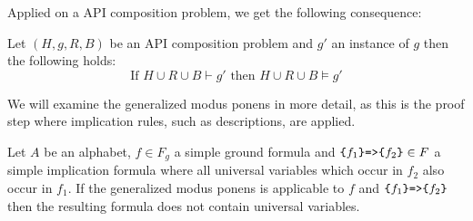 Applied on a API composition problem, we get the following consequence:
\begin{corollary}
Let $(H,g,R,B)$ be an API composition problem and $g'$ an instance  of $g$ then the following holds:
\[\text{If }H\cup R \cup B \vdash g' \text{ then }H\cup R \cup B \models g'\]
\end{corollary}



%  
 


We will examine the generalized modus ponens in more detail,
as this is the proof step where implication rules, 
such as \restdesc descriptions, are applied.

\label{sec:Reasoning}
\begin{lemma}\label{lemma:Reasoning}
Let $A$ be an \nthree alphabet, %
$f\in F_g$ a simple ground formula and $\verb!{!f_1\verb!}=>{!f_2\verb!}!\in F$ a simple implication formula %
where all 
universal variables which occur in $f_2$ %
also occur in $f_1$. If the generalized modus ponens is applicable to $f$ and $\verb!{!f_1\verb!}=>{!f_2\verb!}!$ then
the resulting formula does not contain universal variables.
\end{lemma}


